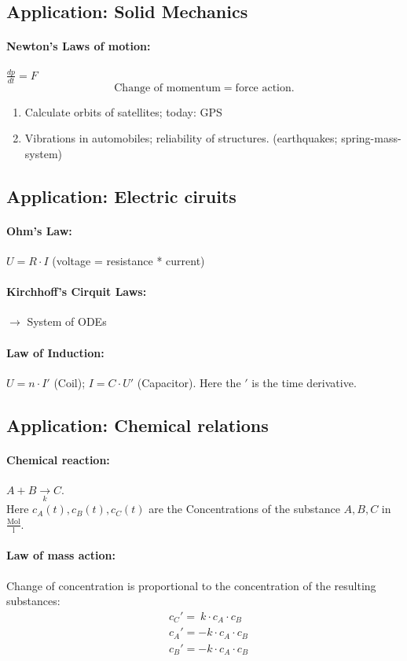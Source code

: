 \documentclass[]{article}
\begin{document}
	\subsection{Application: Solid Mechanics}
	\paragraph{Newton's Laws of motion:} $ \frac{dp}{dt}=F $ 
	\[
	\text{Change of momentum}= \text{force action}
	.\]
	\begin{enumerate}
		\renewcommand{\labelenumi}{\alph{enumi})}
		\item Calculate orbits of satellites; today: GPS
		\item Vibrations in automobiles; reliability of structures. (earthquakes; spring-mass-system)
	\end{enumerate}
	
	\subsection{Application: Electric ciruits}
	\paragraph{Ohm's Law:} $ U=R \cdot I $ (voltage = resistance * current)
	\paragraph{Kirchhoff's Cirquit Laws:} $\rightarrow$ System of ODEs
	\paragraph{Law of Induction:} $ U=n \cdot I' $ (Coil); $ I = C \cdot U' $ (Capacitor). Here the $'$ is the time derivative.
	\subsection{Application: Chemical relations}
	\paragraph{Chemical reaction:} $ A+B\underset{k}\longrightarrow C $. \\  Here $c_A(t), c_B(t), c_C(t)$ are the Concentrations of the substance $A,B,C$ in $ \frac{ \text{Mol}}{\text{l}}$. 
	\paragraph{Law of mass action:} 
	Change of concentration is proportional to the concentration of the resulting substances:
	\[
	\begin{split}
		 & c_C'=~k \cdot c_A \cdot c_B \\
		 & c_A'=-k \cdot c_A \cdot c_B \\
		 & c_B'=-k \cdot c_A \cdot c_B \\
	\end{split}
	\]
\end{document}
